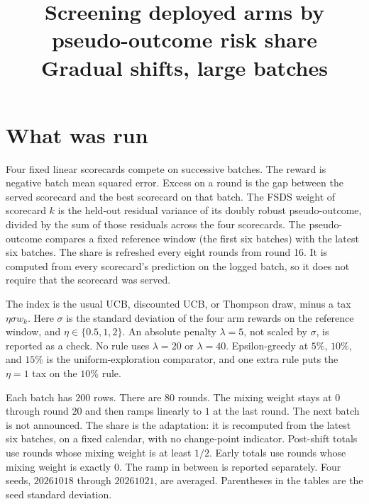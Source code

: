 \documentclass[11pt]{article}
\title{Screening deployed arms by pseudo-outcome risk share\\
\large Gradual shifts, large batches}
\author{}
\date{}
\begin{document}
\maketitle

\section{What was run}

Four fixed linear scorecards compete on successive batches.
The reward is negative batch mean squared error.
Excess on a round is the gap between the served scorecard and the best scorecard on that batch.
The FSDS weight of scorecard \(k\) is the held-out residual variance of its doubly robust pseudo-outcome, divided by the sum of those residuals across the four scorecards.
The pseudo-outcome compares a fixed reference window (the first six batches) with the latest six batches.
The share is refreshed every eight rounds from round 16.
It is computed from every scorecard's prediction on the logged batch, so it does not require that the scorecard was served.

The index is the usual UCB, discounted UCB, or Thompson draw, minus a tax \(\eta\sigma w_k\).
Here \(\sigma\) is the standard deviation of the four arm rewards on the reference window, and \(\eta\in\{0.5,1,2\}\).
An absolute penalty \(\lambda=5\), not scaled by \(\sigma\), is reported as a check.
No rule uses \(\lambda=20\) or \(\lambda=40\).
Epsilon-greedy at \(5\%\), \(10\%\), and \(15\%\) is the uniform-exploration comparator, and one extra rule puts the \(\eta=1\) tax on the \(10\%\) rule.

Each batch has \(200\) rows.
There are \(80\) rounds.
The mixing weight stays at \(0\) through round \(20\) and then ramps linearly to \(1\) at the last round.
The next batch is not announced.
The share is the adaptation: it is recomputed from the latest six batches, on a fixed calendar, with no change-point indicator.
Post-shift totals use rounds whose mixing weight is at least \(1/2\).
Early totals use rounds whose mixing weight is exactly \(0\).
The ramp in between is reported separately.
Four seeds, \(20261018\) through \(20261021\), are averaged.
Parentheses in the tables are the seed standard deviation.
\end{document}
